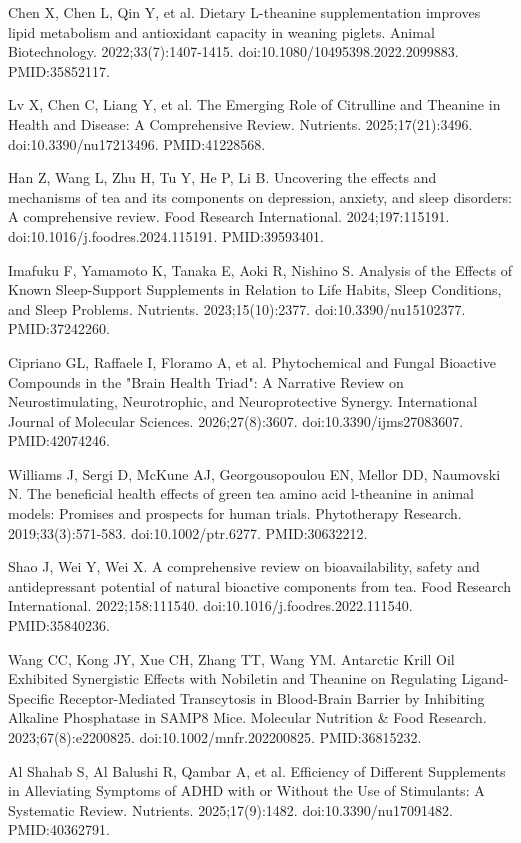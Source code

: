 \documentclass[12pt,oneside]{book}
\newcommand{\reff}[2]{\par\hangindent=7mm\hangafter=1\noindent[#1]\hspace{2mm}#2\par}
\begin{document}
\reff{70}{Chen X, Chen L, Qin Y, et al. Dietary L-theanine supplementation improves lipid metabolism and antioxidant capacity in weaning piglets. Animal Biotechnology. 2022;33(7):1407-1415. doi:10.1080/10495398.2022.2099883. PMID:35852117.}

\reff{71}{Lv X, Chen C, Liang Y, et al. The Emerging Role of Citrulline and Theanine in Health and Disease: A Comprehensive Review. Nutrients. 2025;17(21):3496. doi:10.3390/nu17213496. PMID:41228568.}

\reff{72}{Han Z, Wang L, Zhu H, Tu Y, He P, Li B. Uncovering the effects and mechanisms of tea and its components on depression, anxiety, and sleep disorders: A comprehensive review. Food Research International. 2024;197:115191. doi:10.1016/j.foodres.2024.115191. PMID:39593401.}

\reff{73}{Imafuku F, Yamamoto K, Tanaka E, Aoki R, Nishino S. Analysis of the Effects of Known Sleep-Support Supplements in Relation to Life Habits, Sleep Conditions, and Sleep Problems. Nutrients. 2023;15(10):2377. doi:10.3390/nu15102377. PMID:37242260.}

\reff{74}{Cipriano GL, Raffaele I, Floramo A, et al. Phytochemical and Fungal Bioactive Compounds in the "Brain Health Triad": A Narrative Review on Neurostimulating, Neurotrophic, and Neuroprotective Synergy. International Journal of Molecular Sciences. 2026;27(8):3607. doi:10.3390/ijms27083607. PMID:42074246.}

\reff{75}{Williams J, Sergi D, McKune AJ, Georgousopoulou EN, Mellor DD, Naumovski N. The beneficial health effects of green tea amino acid l-theanine in animal models: Promises and prospects for human trials. Phytotherapy Research. 2019;33(3):571-583. doi:10.1002/ptr.6277. PMID:30632212.}

\reff{76}{Shao J, Wei Y, Wei X. A comprehensive review on bioavailability, safety and antidepressant potential of natural bioactive components from tea. Food Research International. 2022;158:111540. doi:10.1016/j.foodres.2022.111540. PMID:35840236.}

\reff{77}{Wang CC, Kong JY, Xue CH, Zhang TT, Wang YM. Antarctic Krill Oil Exhibited Synergistic Effects with Nobiletin and Theanine on Regulating Ligand-Specific Receptor-Mediated Transcytosis in Blood-Brain Barrier by Inhibiting Alkaline Phosphatase in SAMP8 Mice. Molecular Nutrition \& Food Research. 2023;67(8):e2200825. doi:10.1002/mnfr.202200825. PMID:36815232.}

\reff{78}{Al Shahab S, Al Balushi R, Qambar A, et al. Efficiency of Different Supplements in Alleviating Symptoms of ADHD with or Without the Use of Stimulants: A Systematic Review. Nutrients. 2025;17(9):1482. doi:10.3390/nu17091482. PMID:40362791.}
\end{document}

